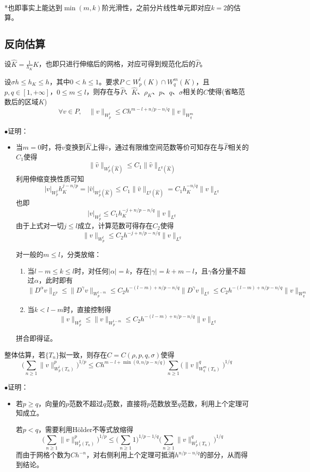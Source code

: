 \documentclass[a4paper,UTF8,fontset=windows]{ctexart}
\newcommand{\proo}[1]{{\kaishu $\bullet$证明：
\begin{itemize}
    \item[] #1
\end{itemize}
}}
\begin{document}
*也即事实上能达到$\min(m,k)$阶光滑性，之前分片线性单元即对应$k=2$的估算。

\subsection{反向估算}
设$\hat{K}=\frac{1}{h_K}K$，也即只进行伸缩后的网格，对应可得到规范化后的$\hat{P}$。

设$\sigma h\le h_K\le h$，其中$0<h\le 1$。要求$P\subset W_p^l(K)\cap W_q^m(K)$，且$p,q\in[1,+\infty]$，$0\le m\le l$，则存在与$\hat{P}$、$\hat{K}$、$\rho_K$、$p$、$q$、$\sigma$相关的$C$使得(省略范数后的区域$K$)
$$\forall v\in P,\quad\|v\|_{W_p^l}\le Ch^{m-l+n/p-n/q}\|v\|_{W_q^m}$$

\proo{
    当$m=0$时，将$v$变换到$\hat{K}$上得$\hat{v}$，通过有限维空间范数等价可知存在与$\hat{P}$相关的$C_1$使得
    $$\|\hat{v}\|_{W_p^l(\hat{K})}\le C_1\|\hat{v}\|_{L^q(\hat{K})}$$
    利用伸缩变换性质可知
    $$|v|_{W_p^j}h_K^{j-n/p}=|\hat{v}|_{W_p^j(\hat{K})}\le C_1\|\hat{v}\|_{L^q(\hat{K})}=C_1 h_K^{-n/q}\|v\|_{L^q}$$
    也即
    $$|v|_{W_p^j}\le C_1 h_K^{-j+n/p-n/q}\|v\|_{L^q}$$
    由于上式对一切$j\le l$成立，计算范数可得存在$C_2$使得
    $$\|v\|_{W_p^l}\le C_2 h^{-j+n/p-n/q}\|v\|_{L^q}$$

    对一般的$m\le l$，分类放缩：
    \begin{enumerate}
        \item 当$l-m\le k\le l$时，对任何$|\alpha|=k$，存在$|\gamma|=k+m-l$，且$\gamma$各分量不超过$\alpha$，此时即有
        $$\|D^\alpha v\|_{L^p}\le\|D^\gamma v\|_{W_p^{l-m}}\le C_2h^{-(l-m)+n/p-n/q}\|D^\gamma v\|_{L^q}\le C_2h^{-(l-m)+n/p-n/q}\|v\|_{W_q^m}$$
        \item 当$k<l-m$时，直接控制得
        $$\|v\|_{W_p^k}\le\|v\|_{W_p^{l-m}}\le C_2h^{-(l-m)+n/p-n/q}\|v\|_{L^q}$$
    \end{enumerate}
    拼合即得证。
}

整体估算，若$\{T_n\}$拟一致，则存在$C=C(\rho,p,q,\sigma)$使得
$$\bigg(\sum_{n\ge1}\|v\|_{W_p^l(T_n)}^p\bigg)^{1/p}\le Ch^{m-l+\min(0,n/p-n/q)}\sum_{n\ge1}\bigg(\|v\|_{W_q^m(T_n)}^q\bigg)^{1/q}$$

\proo{
    若$p\ge q$，向量的$p$范数不超过$q$范数，直接将$p$范数放至$q$范数，利用上个定理可知成立。

    若$p<q$，需要利用H\"older不等式放缩得
    $$\bigg(\sum_{n\ge1}\|v\|_{W_p^l(T_n)}^p\bigg)^{1/p}\le\bigg(\sum_{n\ge1}1\bigg)^{1/p-1/q}\bigg(\sum_{n\ge1}\|v\|_{W_p^l(T_n)}^q\bigg)^{1/q}$$
    而由于网格个数为$Ch^{-n}$，对右侧利用上个定理可抵消$h^{n/p-n/q}$的部分，从而得到结论。
}
\end{document}
